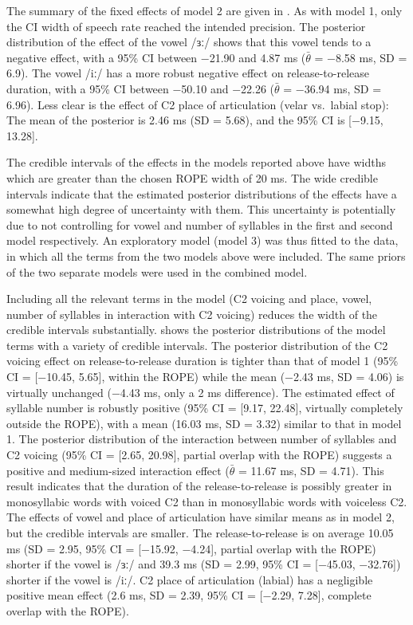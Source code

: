 \documentclass[12pt,a4paper,]{article}
\begin{document}
The summary of the fixed effects of model 2 are given in
. As with model 1, only the CI width of speech rate
reached the intended precision. The posterior distribution of the effect
of the vowel /ɜː/ shows that this vowel tends to a negative effect, with
a 95\% CI between −21.90 and 4.87 ms (\(\bar{\theta}\) = −8.58 ms, SD =
6.9). The vowel /iː/ has a more robust negative effect on
release-to-release duration, with a 95\% CI between −50.10 and −22.26
(\(\bar{\theta}\) = −36.94 ms, SD = 6.96). Less clear is the effect of
C2 place of articulation (velar vs.~labial stop): The mean of the
posterior is 2.46 ms (SD = 5.68), and the 95\% CI is {[}−9.15, 13.28{]}.

The credible intervals of the effects in the models reported above have
widths which are greater than the chosen ROPE width of 20 ms. The wide
credible intervals indicate that the estimated posterior distributions
of the effects have a somewhat high degree of uncertainty with them.
This uncertainty is potentially due to not controlling for vowel and
number of syllables in the first and second model respectively. An
exploratory model (model 3) was thus fitted to the data, in which all
the terms from the two models above were included. The same priors of
the two separate models were used in the combined model.

Including all the relevant terms in the model (C2 voicing and place,
vowel, number of syllables in interaction with C2 voicing) reduces the
width of the credible intervals substantially.  shows
the posterior distributions of the model terms with a variety of
credible intervals. The posterior distribution of the C2 voicing effect
on release-to-release duration is tighter than that of model 1 (95\% CI
= {[}−10.45, 5.65{]}, within the ROPE) while the mean (−2.43 ms, SD =
4.06) is virtually unchanged (−4.43 ms, only a 2 ms difference). The
estimated effect of syllable number is robustly positive (95\% CI =
{[}9.17, 22.48{]}, virtually completely outside the ROPE), with a mean
(16.03 ms, SD = 3.32) similar to that in model 1. The posterior
distribution of the interaction between number of syllables and C2
voicing (95\% CI = {[}2.65, 20.98{]}, partial overlap with the ROPE)
suggests a positive and medium-sized interaction effect
(\(\bar{\theta}\) = 11.67 ms, SD = 4.71). This result indicates that the
duration of the release-to-release is possibly greater in monosyllabic
words with voiced C2 than in monosyllabic words with voiceless C2. The
effects of vowel and place of articulation have similar means as in
model 2, but the credible intervals are smaller. The release-to-release
is on average 10.05 ms (SD = 2.95, 95\% CI = {[}−15.92, −4.24{]},
partial overlap with the ROPE) shorter if the vowel is /ɜː/ and 39.3 ms
(SD = 2.99, 95\% CI = {[}−45.03, −32.76{]}) shorter if the vowel is
/iː/. C2 place of articulation (labial) has a negligible positive mean
effect (2.6 ms, SD = 2.39, 95\% CI = {[}−2.29, 7.28{]}, complete overlap
with the ROPE).
\end{document}
